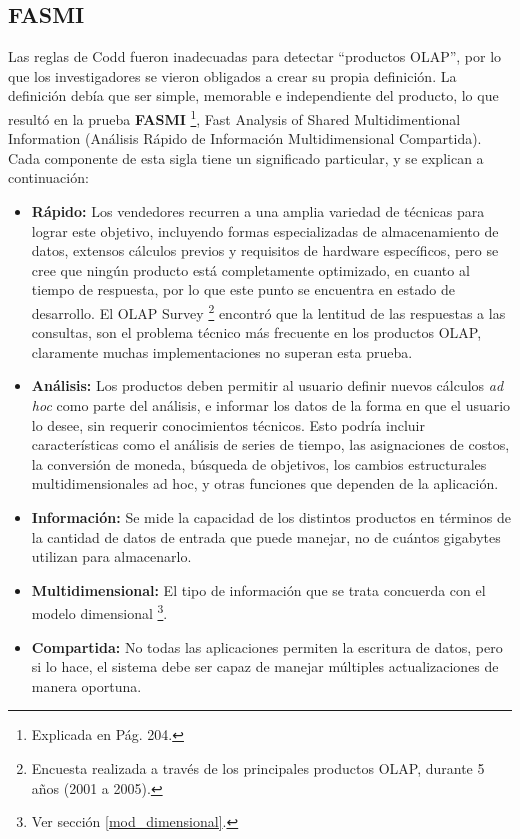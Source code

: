 \documentclass[a4paper,11pt]{article}
\begin{document}
    
    \subsection{FASMI}
    
    Las reglas de Codd fueron inadecuadas para detectar ``productos OLAP'', por lo que los investigadores se vieron obligados a crear su propia
    definición. La definición debía que ser simple, memorable e independiente del producto, lo que resultó en la prueba \textbf{FASMI} \footnote{Explicada en
    \cite{nagabhushana} Pág. 204.}, Fast Analysis of Shared Multidimentional Information (Análisis Rápido de Información 
    Multidimensional Compartida). Cada componente de esta sigla tiene un significado particular, y se explican a continuación:
    
    \begin{itemize}
      \item \textbf{Rápido:} Los vendedores recurren a una amplia variedad de técnicas para lograr este objetivo, incluyendo formas especializadas de
      almacenamiento de datos, extensos cálculos previos y requisitos de hardware específicos, pero se cree que ningún producto está completamente
      optimizado, en cuanto al tiempo de respuesta, por lo que este punto se encuentra en estado de desarrollo.
      El OLAP Survey \footnote{Encuesta realizada a través de los principales productos OLAP, durante 5 años (2001 a 2005).} encontró
      que la lentitud de las respuestas a las consultas, son el problema técnico más frecuente en los productos OLAP, claramente muchas implementaciones
      no superan esta prueba.
      \item \textbf{Análisis:} Los productos deben permitir al usuario definir nuevos cálculos \textit{ad hoc} como parte del análisis, e informar los datos de la
      forma en que el usuario lo desee, sin requerir conocimientos técnicos. Esto podría incluir características como el análisis de series de tiempo, las
      asignaciones de costos, la conversión de moneda, búsqueda de objetivos, los cambios estructurales multidimensionales ad hoc, y otras funciones que
      dependen de la aplicación.
      \item \textbf{Información:} Se mide la capacidad de los distintos productos en términos de la cantidad de datos de entrada que puede manejar,
      no de cuántos gigabytes utilizan para almacenarlo.
      \item \textbf{Multidimensional:} El tipo de información que se trata concuerda con el modelo dimensional \footnote{Ver sección \ref{mod_dimensional}.}.
      \item \textbf{Compartida:} No todas las aplicaciones permiten la escritura de datos, pero si lo hace, el sistema debe ser capaz de manejar múltiples
      actualizaciones de manera oportuna.
    \end{itemize}
    
\end{document}
